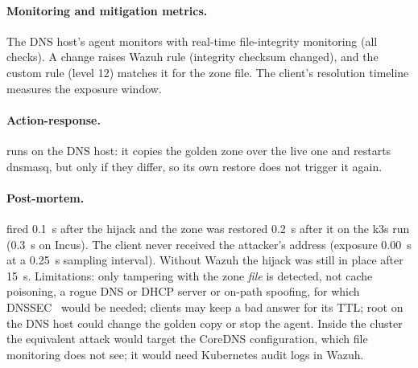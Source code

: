 \paragraph{Monitoring and mitigation metrics.}
The DNS host's agent monitors  with real-time file-integrity monitoring
(all checks). A change raises Wazuh rule  (integrity checksum changed), and the custom rule
 (level 12) matches it for the zone file. The client's resolution timeline measures the
exposure window.

\paragraph{Action-response.}
 runs on the DNS host: it copies the golden zone over the live one and restarts
dnsmasq, but only if they differ, so its own restore does not trigger it again.

\paragraph{Post-mortem.}
 fired 0.1~s after the hijack and the zone was restored 0.2~s after it on the k3s run
(0.3~s on Incus). The client never received the attacker's address (exposure 0.00~s at a 0.25~s
sampling interval). Without Wazuh the hijack was still in place after 15~s. Limitations: only
tampering with the zone \emph{file} is detected, not cache poisoning, a rogue DNS or DHCP server or
on-path spoofing, for which DNSSEC~\cite{rfc4033} would be needed; clients may keep a bad answer
for its TTL; root on the DNS host could change the golden copy or stop the agent. Inside the cluster
the equivalent attack would target the CoreDNS configuration, which file monitoring does not see;
it would need Kubernetes audit logs in Wazuh.
